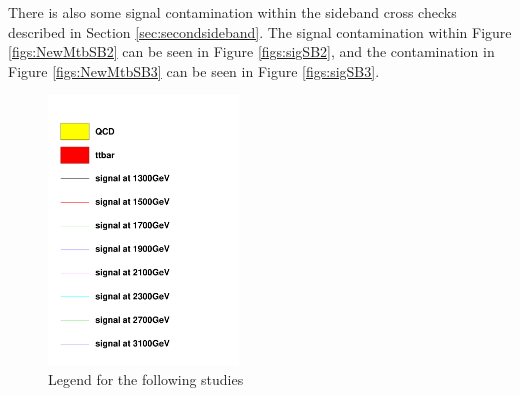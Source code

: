 There is also some signal contamination within the sideband cross checks described in Section \ref{sec:secondsideband}.  The signal contamination within Figure \ref{figs:NewMtbSB2} can be seen in Figure \ref{figs:sigSB2}, 
and the contamination in Figure \ref{figs:NewMtbSB3} can be seen in Figure \ref{figs:sigSB3}. 

\begin{figure}[Htcb]
\centering
\includegraphics[width=0.45\textwidth]{AN-13-004/figs/legend.pdf}
\caption{Legend for the following studies}
\label{figs:legend}
\end{figure}

